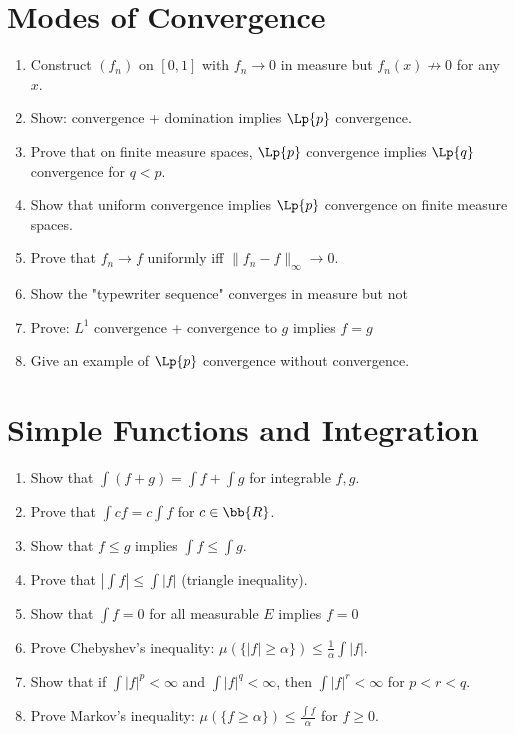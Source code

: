 \section{Modes of Convergence}

\begin{enumerate}
    \item Construct $(f_n)$ on $[0,1]$ with $f_n \to 0$ in measure but $f_n(x) \not\to 0$ for any $x$.
    \item Show: \almosteverywhere{} convergence + domination implies $\Lp{p}$ convergence.
    \item Prove that on finite measure spaces, $\Lp{p}$ convergence implies $\Lp{q}$ convergence for $q < p$.
    \item Show that uniform convergence implies $\Lp{p}$ convergence on finite measure spaces.
    \item Prove that $f_n \to f$ uniformly iff $\|f_n - f\|_\infty \to 0$.
    \item Show the "typewriter sequence" converges in measure but not \almosteverywhere{}
    \item Prove: $L^1$ convergence + \almosteverywhere{} convergence to $g$ implies $f = g$ \almosteverywhere{}
    \item Give an example of $\Lp{p}$ convergence without \almosteverywhere{} convergence.
\end{enumerate}

\section{Simple Functions and Integration}

\begin{enumerate}
    \item Show that $\int (f + g) = \int f + \int g$ for integrable $f, g$.
    \item Prove that $\int cf = c \int f$ for $c \in \bb{R}$.
    \item Show that $f \leq g$ \almosteverywhere{} implies $\int f \leq \int g$.
    \item Prove that $|\int f| \leq \int |f|$ (triangle inequality).
    \item Show that $\int f = 0$ for all measurable $E$ implies $f = 0$ \almosteverywhere{}
    \item Prove Chebyshev's inequality: $\mu(\{|f| \geq \alpha\}) \leq \frac{1}{\alpha} \int |f|$.
    \item Show that if $\int |f|^p < \infty$ and $\int |f|^q < \infty$, then $\int |f|^r < \infty$ for $p < r < q$.
    \item Prove Markov's inequality: $\mu(\{f \geq \alpha\}) \leq \frac{\int f}{\alpha}$ for $f \geq 0$.
\end{enumerate}

